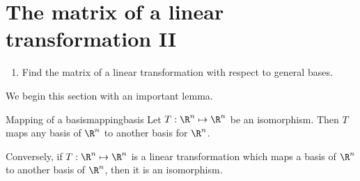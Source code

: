 \section{The matrix of a linear transformation II}


\begin{outcome}

\begin{enumerate}

\item[A.] Find the matrix of a linear transformation with respect to general bases. 

\end{enumerate}
\end{outcome}

We begin this section with an important lemma. 

\begin{lemma}{Mapping of a basis}{mappingbasis}
Let $T: \R^n \mapsto \R^n$ be an isomorphism.  Then $T$ maps any basis of
$\R^n$ to another basis for $\R^n$. 

Conversely, if $T:
\R^n \mapsto \R^n$ is a linear transformation which
maps a basis of $\R^n$ to another basis of $\R^n$,
then it is an isomorphism.
\end{lemma}


